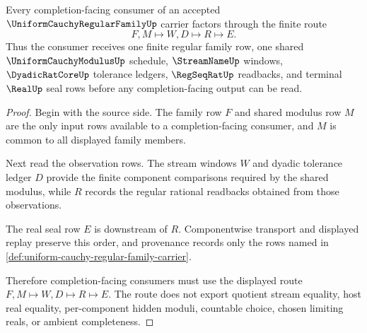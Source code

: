 \begin{theorem}
\label{thm:uniform-cauchy-regular-family-real-completion-handoff}
Every completion-facing consumer of an accepted $\UniformCauchyRegularFamilyUp$ carrier factors through the finite route
$$
F,M \longmapsto W,D \longmapsto R \longmapsto E .
$$
Thus the consumer receives one finite regular family row, one shared $\UniformCauchyModulusUp$ schedule, $\StreamNameUp$ windows, $\DyadicRatCoreUp$ tolerance ledgers, $\RegSeqRatUp$ readbacks, and terminal $\RealUp$ seal rows before any completion-facing output can be read.
\end{theorem}
\begin{proof}
Begin with the source side. The family row $F$ and shared modulus row $M$ are the only input rows available to a completion-facing consumer, and $M$ is common to all displayed family members.

Next read the observation rows. The stream windows $W$ and dyadic tolerance ledger $D$ provide the finite component comparisons required by the shared modulus, while $R$ records the regular rational readbacks obtained from those observations.

The real seal row $E$ is downstream of $R$. Componentwise transport and displayed replay preserve this order, and provenance records only the rows named in \autoref{def:uniform-cauchy-regular-family-carrier}.

Therefore completion-facing consumers must use the displayed route $F,M \mapsto W,D \mapsto R \mapsto E$. The route does not export quotient stream equality, host real equality, per-component hidden moduli, countable choice, chosen limiting reals, or ambient completeness.
\end{proof}


\begin{closurestatus}{\UniformCauchyRegularFamilyUp}
  \theoryclosure{\seedClosure}
  \formalstatus{\unformalizedV}
\end{closurestatus}
